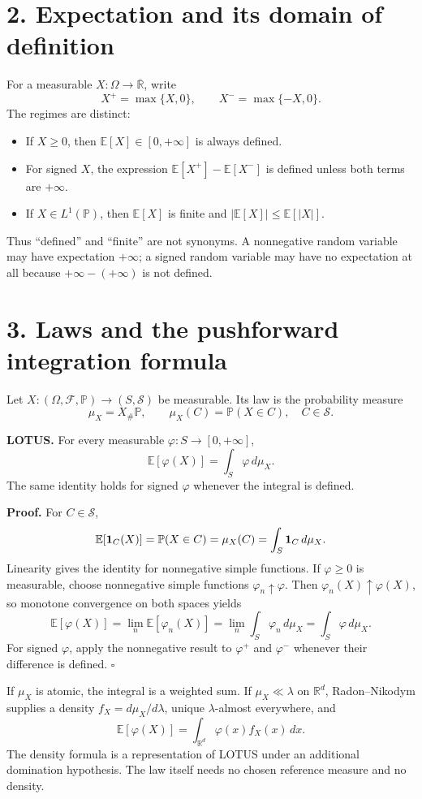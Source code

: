 \section*{2. Expectation and its domain of definition}

For a measurable $X:\Omega\to\overline{\mathbb R}$, write
\[
X^+=\max\{X,0\},
\qquad
X^-=\max\{-X,0\}.
\]
The regimes are distinct:
\begin{itemize}
  \item If $X\ge0$, then $\mathbb E[X]\in[0,+\infty]$ is always defined.
  \item For signed $X$, the expression $\mathbb E[X^+]-\mathbb E[X^-]$ is defined unless both terms are $+\infty$.
  \item If $X\in L^1(\mathbb P)$, then $\mathbb E[X]$ is finite and $|\mathbb E[X]|\le\mathbb E[|X|]$.
\end{itemize}
Thus ``defined'' and ``finite'' are not synonyms. A nonnegative random variable may have expectation $+\infty$; a signed random variable may have no expectation at all because $+\infty-(+\infty)$ is not defined.

\section*{3. Laws and the pushforward integration formula}

Let $X:(\Omega,\mathcal F,\mathbb P)\to(S,\mathcal S)$ be measurable. Its law is the probability measure
\[
\mu_X=X_\#\mathbb P,
\qquad
\mu_X(C)=\mathbb P(X\in C),
\quad C\in\mathcal S.
\]

\textbf{LOTUS.}
For every measurable $\varphi:S\to[0,+\infty]$,
\[
\boxed{
\mathbb E[\varphi(X)]
=
\int_S\varphi\,d\mu_X
}.
\]
The same identity holds for signed $\varphi$ whenever the integral is defined.

\textbf{Proof.}
For $C\in\mathcal S$,
\[
\mathbb E[\mathbf 1_C(X)]
=
\mathbb P(X\in C)
=
\mu_X(C)
=
\int_S\mathbf 1_C\,d\mu_X.
\]
Linearity gives the identity for nonnegative simple functions. If $\varphi\ge0$ is measurable, choose nonnegative simple functions $\varphi_n\uparrow\varphi$. Then $\varphi_n(X)\uparrow\varphi(X)$, so monotone convergence on both spaces yields
\[
\mathbb E[\varphi(X)]
=
\lim_n\mathbb E[\varphi_n(X)]
=
\lim_n\int_S\varphi_n\,d\mu_X
=
\int_S\varphi\,d\mu_X.
\]
For signed $\varphi$, apply the nonnegative result to $\varphi^+$ and $\varphi^-$ whenever their difference is defined. \hfill$\square$

If $\mu_X$ is atomic, the integral is a weighted sum. If $\mu_X\ll\lambda$ on $\mathbb R^d$, Radon--Nikodym supplies a density $f_X=d\mu_X/d\lambda$, unique $\lambda$-almost everywhere, and
\[
\mathbb E[\varphi(X)]
=
\int_{\mathbb R^d}\varphi(x)f_X(x)\,dx.
\]
The density formula is a representation of LOTUS under an additional domination hypothesis. The law itself needs no chosen reference measure and no density.

